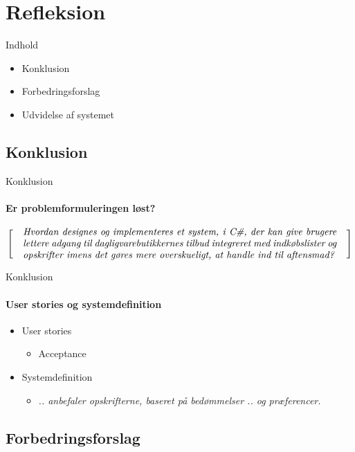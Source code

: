 \section{Refleksion}
\begin{frame}{Indhold}
  \begin{itemize}
    \item Konklusion
    \item Forbedringsforslag
    \item Udvidelse af systemet
  \end{itemize}
\end{frame}

\subsection{Konklusion}
\begin{frame}{Konklusion}
  \framesubtitle{Er problemformuleringen løst?}
  \[
  \left[
  \begin{minipage}{\textwidth}
  \centering
  \begin{minipage}{0.94\textwidth}
  \textit{Hvordan designes og implementeres et system, i C\#, der kan give brugere lettere adgang til dagligvarebutikkernes tilbud integreret med indkøbslister og opskrifter imens det gøres mere overskueligt, at handle ind til aftensmad?}
  \end{minipage} 
  \end{minipage}                           
    \right]
\]
\end{frame}
\begin{frame}{Konklusion}
  \framesubtitle{User stories og systemdefinition}
    \begin{itemize}
      \item User stories
      \begin{itemize}
        \item Acceptance
      \end{itemize}
      \item Systemdefinition
      \begin{itemize}
        \item \textit{.. anbefaler opskrifterne, baseret på bedømmelser .. og præferencer.}
      \end{itemize}      
    \end{itemize}
\end{frame}

\subsection{Forbedringsforslag}


